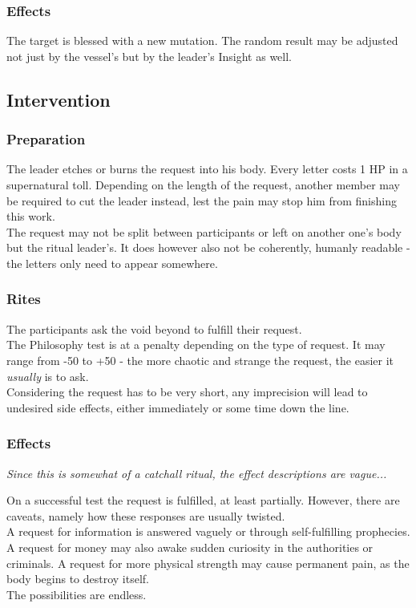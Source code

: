 \subsubsection*{Effects}
The target is blessed with a new mutation.
The random result may be adjusted not just by the vessel's
	but by the leader's Insight as well.

\subsection*{Intervention}
\subsubsection*{Preparation}
The leader etches or burns the request into his body.
Every letter costs 1 HP in a supernatural toll.
Depending on the length of the request,
another member may be required to cut the leader instead,
lest the pain may stop him from finishing this work.
\\%
The request may not be split between participants
	or left on another one's body but the ritual leader's.
It does however also not be coherently, humanly readable
	- the letters only need to appear somewhere.
\subsubsection*{Rites}
The participants ask the void beyond to fulfill their request.
\\%
The Philosophy test is at a penalty depending on the type of request.
It may range from -50 to +50
	- the more chaotic and strange the request,
	the easier it \emph{usually} is to ask.
\\%
Considering the request has to be very short,
	any imprecision will lead to undesired side effects,
	either immediately or some time down the line.
\subsubsection*{Effects}
\emph{Since this is somewhat of a catchall ritual, the effect descriptions are vague...}
\par \vspace{-8mm}
On a successful test the request is fulfilled, at least partially.
However, there are caveats, namely how these responses are usually twisted.
\\%
A request for information is answered vaguely or through self-fulfilling prophecies.
A request for money may also awake sudden curiosity in the authorities or criminals.
A request for more physical strength may cause permanent pain,
 as the body begins to destroy itself.
\\%
The possibilities are endless.
